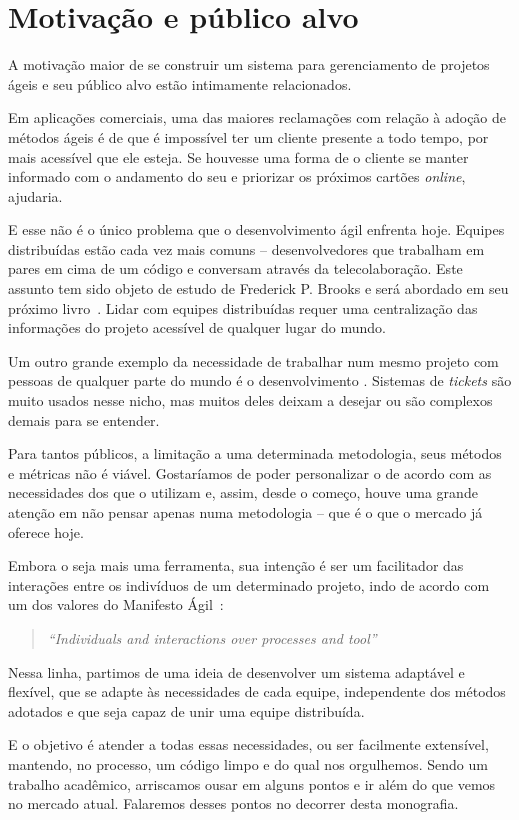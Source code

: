 \section{Motivação e público alvo}

A motivação maior de se construir um sistema para gerenciamento de projetos ágeis e seu público alvo estão intimamente relacionados. 

Em aplicações comerciais, uma das maiores reclamações com relação à adoção de métodos ágeis é de que é impossível ter um cliente presente a todo tempo, por mais acessível que ele esteja. Se houvesse uma forma de o cliente se manter informado com o andamento do seu \software{} e priorizar os próximos cartões \textit{online}, ajudaria.

E esse não é o único problema que o desenvolvimento ágil enfrenta hoje. Equipes distribuídas estão cada vez mais comuns -- desenvolvedores que trabalham em pares em cima de um código e conversam através da telecolaboração. Este assunto tem sido objeto de estudo de Frederick P. Brooks e será abordado em seu próximo livro~\cite{brooks}. Lidar com equipes distribuídas requer uma centralização das informações do projeto acessível de qualquer lugar do mundo.

Um outro grande exemplo da necessidade de trabalhar num mesmo projeto com pessoas de qualquer parte do mundo é o desenvolvimento \opensource. Sistemas de \textit{tickets} são muito usados nesse nicho, mas muitos deles deixam a desejar ou são complexos demais para se entender.

Para tantos públicos, a limitação a uma determinada metodologia, seus métodos e métricas não é viável. Gostaríamos de poder personalizar o \calopsita{} de acordo com as necessidades dos que o utilizam e, assim, desde o começo, houve uma grande atenção em não pensar apenas numa metodologia -- que é o que o mercado já oferece hoje.

Embora o \calopsita{} seja mais uma ferramenta, sua intenção é ser um facilitador das interações entre os indivíduos de um determinado projeto, indo de acordo com um dos valores do Manifesto Ágil~\cite{manifesto}:

\begin{quote}
\textit{``Individuals and interactions over processes and tool''}
\end{quote}

Nessa linha, partimos de uma ideia de desenvolver um sistema adaptável e flexível, que se adapte às necessidades de cada equipe, independente dos métodos adotados e que seja capaz de unir uma equipe distribuída.

E o objetivo é atender a todas essas necessidades, ou ser facilmente extensível, mantendo, no processo, um código limpo e do qual nos orgulhemos. Sendo um trabalho acadêmico, arriscamos ousar em alguns pontos e ir além do que vemos no mercado atual. Falaremos desses pontos no decorrer desta monografia.

